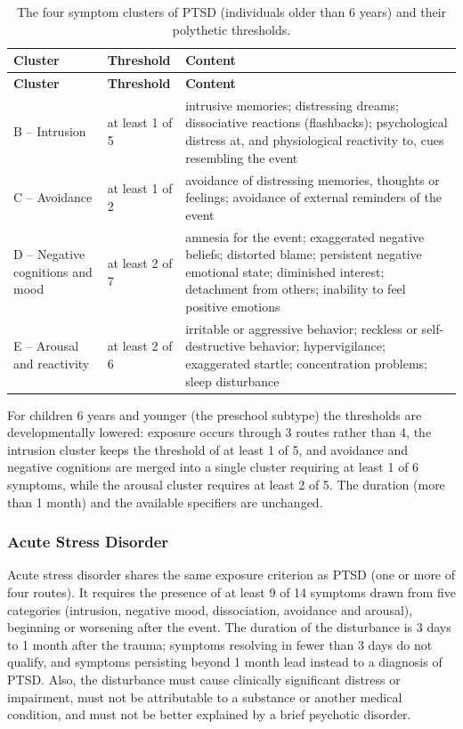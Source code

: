 \begin{longtable}{@{}p{}p{}p{}@{}}
  \caption{The four symptom clusters of PTSD (individuals older than 6 years) and
  their polythetic thresholds.}\label{tab:ptsd-clusters}\\
  \toprule
  \textbf{Cluster} & \textbf{Threshold} & \textbf{Content} \\
  \midrule
  \endfirsthead
  \toprule
  \textbf{Cluster} & \textbf{Threshold} & \textbf{Content} \\
  \midrule
  \endhead
  \bottomrule
  \endlastfoot
  B -- Intrusion & at least 1 of 5 &
    intrusive memories; distressing dreams; dissociative reactions
    (flashbacks); psychological distress at, and physiological reactivity to,
    cues resembling the event \\
  C -- Avoidance & at least 1 of 2 &
    avoidance of distressing memories, thoughts or feelings; avoidance of
    external reminders of the event \\
  D -- Negative cognitions and mood & at least 2 of 7 &
    amnesia for the event; exaggerated negative beliefs; distorted blame;
    persistent negative emotional state; diminished interest; detachment from
    others; inability to feel positive emotions \\
  E -- Arousal and reactivity & at least 2 of 6 &
    irritable or aggressive behavior; reckless or self-destructive behavior;
    hypervigilance; exaggerated startle; concentration problems; sleep
    disturbance \\
\end{longtable}

For children 6 years and younger (the preschool subtype) the thresholds
are developmentally lowered: exposure occurs through 3 routes rather than 4, the
intrusion cluster keeps the threshold of at least 1 of 5, and avoidance and
negative cognitions are merged into a single cluster requiring at least 1
of 6 symptoms, while the arousal cluster requires at least 2 of 5. The
duration (more than 1 month) and the available specifiers are unchanged.

\subsubsection{Acute Stress Disorder}

Acute stress disorder shares the same exposure criterion as PTSD (one or more of
four routes). It requires the presence of at least 9 of 14 symptoms
drawn from five categories (intrusion, negative mood, dissociation, avoidance and
arousal), beginning or worsening after the event. The duration of the disturbance
is 3 days to 1 month after the trauma; symptoms resolving in fewer than 3
days do not qualify, and symptoms persisting beyond 1 month lead instead to a
diagnosis of PTSD. Also, the disturbance must cause clinically significant distress or
impairment, must not be attributable to a substance or another medical condition,
and must not be better explained by a brief psychotic disorder.

